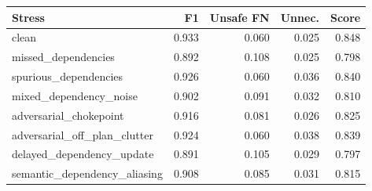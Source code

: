 \begin{tabular}{lrrrr}
\toprule
Stress & F1 & Unsafe FN & Unnec. & Score \\
\midrule
clean & 0.933 & 0.060 & 0.025 & 0.848 \\
missed\_dependencies & 0.892 & 0.108 & 0.025 & 0.798 \\
spurious\_dependencies & 0.926 & 0.060 & 0.036 & 0.840 \\
mixed\_dependency\_noise & 0.902 & 0.091 & 0.032 & 0.810 \\
adversarial\_chokepoint & 0.916 & 0.081 & 0.026 & 0.825 \\
adversarial\_off\_plan\_clutter & 0.924 & 0.060 & 0.038 & 0.839 \\
delayed\_dependency\_update & 0.891 & 0.105 & 0.029 & 0.797 \\
semantic\_dependency\_aliasing & 0.908 & 0.085 & 0.031 & 0.815 \\
\bottomrule
\end{tabular}
